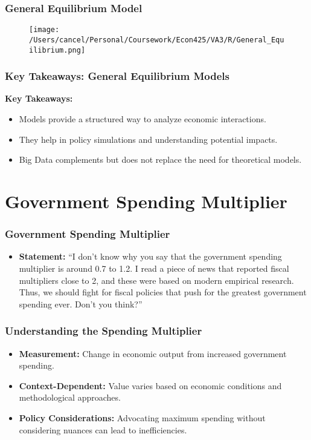 \documentclass{beamer}
\begin{document}
\begin{frame}
    \frametitle{General Equilibrium Model}
    \begin{figure}[h!]
        \centering
        \texttt{[image: /Users/cancel/Personal/Coursework/Econ425/VA3/R/General\_Equilibrium.png]}
    \end{figure}
\end{frame}

\begin{frame}
    \frametitle{Key Takeaways: General Equilibrium Models}
    \textbf{Key Takeaways:}
    \begin{itemize}
        \item Models provide a structured way to analyze economic interactions.
        \item They help in policy simulations and understanding potential impacts.
        \item Big Data complements but does not replace the need for theoretical models.
    \end{itemize}
\end{frame}

\section{Government Spending Multiplier}

\begin{frame}
    \frametitle{Government Spending Multiplier}
    \begin{itemize}
        \item \textbf{Statement:} ``I don't know why you say that the government spending multiplier is around 0.7 to 1.2. I read a piece of news that reported fiscal multipliers close to 2, and these were based on modern empirical research. Thus, we should fight for fiscal policies that push for the greatest government spending ever. Don't you think?''
    \end{itemize}
\end{frame}

\begin{frame}
    \frametitle{Understanding the Spending Multiplier}
    \begin{itemize}
        \item \textbf{Measurement:} Change in economic output from increased government spending.
        \item \textbf{Context-Dependent:} Value varies based on economic conditions and methodological approaches.
        \item \textbf{Policy Considerations:} Advocating maximum spending without considering nuances can lead to inefficiencies.
    \end{itemize}
\end{frame}
\end{document}
